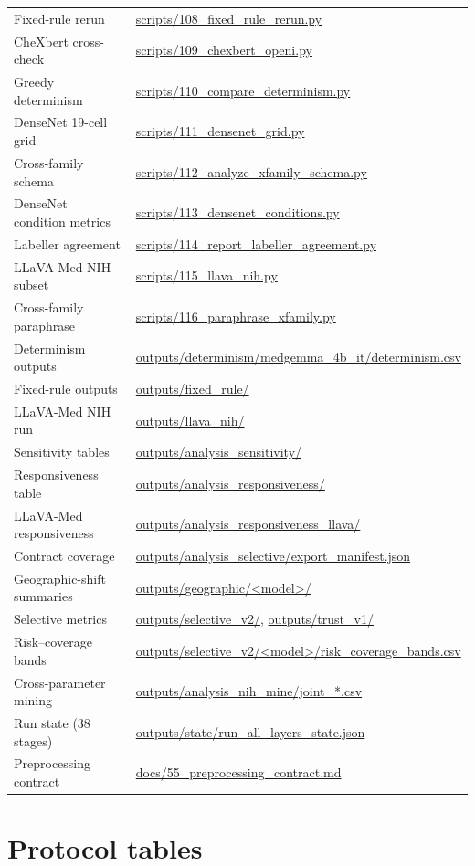 \begin{table}[H]
\begin{tabular}{ll}
Fixed-rule rerun & \url{scripts/108_fixed_rule_rerun.py} \\
CheXbert cross-check & \url{scripts/109_chexbert_openi.py} \\
Greedy determinism & \url{scripts/110_compare_determinism.py} \\
DenseNet 19-cell grid & \url{scripts/111_densenet_grid.py} \\
Cross-family schema & \url{scripts/112_analyze_xfamily_schema.py} \\
DenseNet condition metrics & \url{scripts/113_densenet_conditions.py} \\
Labeller agreement & \url{scripts/114_report_labeller_agreement.py} \\
LLaVA-Med NIH subset & \url{scripts/115_llava_nih.py} \\
Cross-family paraphrase & \url{scripts/116_paraphrase_xfamily.py} \\
Determinism outputs & \url{outputs/determinism/medgemma_4b_it/determinism.csv} \\
Fixed-rule outputs & \url{outputs/fixed_rule/} \\
LLaVA-Med NIH run & \url{outputs/llava_nih/} \\
Sensitivity tables & \url{outputs/analysis_sensitivity/} \\
Responsiveness table & \url{outputs/analysis_responsiveness/} \\
LLaVA-Med responsiveness & \url{outputs/analysis_responsiveness_llava/} \\
Contract coverage & \url{outputs/analysis_selective/export_manifest.json} \\
Geographic-shift summaries & \url{outputs/geographic/<model>/} \\
Selective metrics & \url{outputs/selective_v2/}, \url{outputs/trust_v1/} \\
Risk--coverage bands & \url{outputs/selective_v2/<model>/risk_coverage_bands.csv} \\
Cross-parameter mining & \url{outputs/analysis_nih_mine/joint_*.csv} \\
Run state (38 stages) & \url{outputs/state/run_all_layers_state.json} \\
Preprocessing contract & \url{docs/55_preprocessing_contract.md} \\
\bottomrule
\end{tabular}
\end{table}

\section{Protocol tables}
\label{app:protocol}

